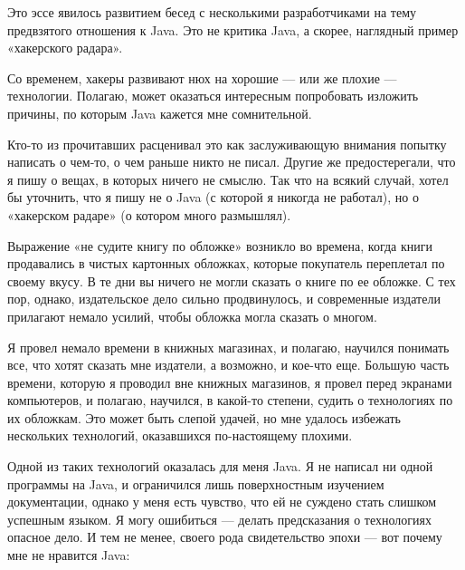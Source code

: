 \documentclass[ebook,12pt,oneside,openany]{memoir}
\author{Пол Грэм} \date{}
\begin{document}
\maketitle

Это эссе явилось развитием бесед с несколькими разработчиками на тему
предвзятого отношения к Java. Это не критика Java, а скорее, наглядный
пример «хакерского радара».

Со временем, хакеры развивают нюх на хорошие — или же плохие —
технологии. Полагаю, может оказаться интересным попробовать изложить
причины, по которым Java кажется мне сомнительной.

Кто-то из прочитавших расценивал это как заслуживающую внимания
попытку написать о чем-то, о чем раньше никто не писал. Другие же
предостерегали, что я пишу о вещах, в которых ничего не смыслю. Так
что на всякий случай, хотел бы уточнить, что я пишу не о Java (с
которой я никогда не работал), но о «хакерском радаре» (о котором
много размышлял).


Выражение «не судите книгу по обложке» возникло во времена, когда
книги продавались в чистых картонных обложках, которые покупатель
переплетал по своему вкусу. В те дни вы ничего не могли сказать о
книге по ее обложке. С тех пор, однако, издательское дело сильно
продвинулось, и современные издатели прилагают немало усилий, чтобы
обложка могла сказать о многом.

Я провел немало времени в книжных магазинах, и полагаю, научился
понимать все, что хотят сказать мне издатели, а возможно, и кое-что
еще. Большую часть времени, которую я проводил вне книжных магазинов,
я провел перед экранами компьютеров, и полагаю, научился, в какой-то
степени, судить о технологиях по их обложкам. Это может быть слепой
удачей, но мне удалось избежать нескольких технологий, оказавшихся
по-настоящему плохими.

Одной из таких технологий оказалась для меня Java. Я не написал ни
одной программы на Java, и ограничился лишь поверхностным изучением
документации, однако у меня есть чувство, что ей не суждено стать
слишком успешным языком. Я могу ошибиться — делать предсказания о
технологиях опасное дело. И тем не менее, своего рода свидетельство
эпохи — вот почему мне не нравится Java:
\end{document}
